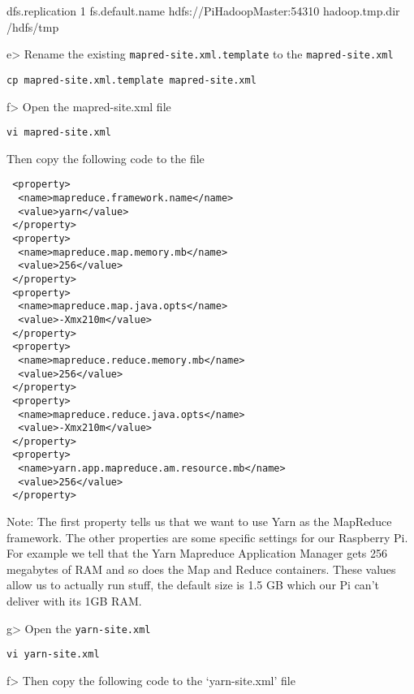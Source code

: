  dfs.replication 1 fs.default.name hdfs://PiHadoopMaster:54310
hadoop.tmp.dir /hdfs/tmp

e\textgreater{} Rename the existing \texttt{mapred-site.xml.template} to
the \texttt{mapred-site.xml}

\begin{lstlisting}
cp mapred-site.xml.template mapred-site.xml 
\end{lstlisting}

f\textgreater{} Open the mapred-site.xml file

\begin{lstlisting}
vi mapred-site.xml 
\end{lstlisting}

Then copy the following code to the file

\begin{lstlisting}
 <property>
  <name>mapreduce.framework.name</name>
  <value>yarn</value>
 </property>
 <property>
  <name>mapreduce.map.memory.mb</name>
  <value>256</value>
 </property>
 <property>
  <name>mapreduce.map.java.opts</name>
  <value>-Xmx210m</value>
 </property>
 <property>
  <name>mapreduce.reduce.memory.mb</name>
  <value>256</value>
 </property>
 <property>
  <name>mapreduce.reduce.java.opts</name>
  <value>-Xmx210m</value>
 </property>
 <property>
  <name>yarn.app.mapreduce.am.resource.mb</name>
  <value>256</value>
 </property>
\end{lstlisting}

Note: The first property tells us that we want to use Yarn as the
MapReduce framework. The other properties are some specific settings for
our Raspberry Pi. For example we tell that the Yarn Mapreduce
Application Manager gets 256 megabytes of RAM and so does the Map and
Reduce containers. These values allow us to actually run stuff, the
default size is 1.5 GB which our Pi can't deliver with its 1GB RAM.

g\textgreater{} Open the \texttt{yarn-site.xml}

\begin{lstlisting}
vi yarn-site.xml
\end{lstlisting}

f\textgreater{} Then copy the following code to the `yarn-site.xml' file

